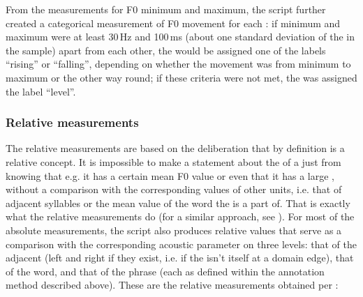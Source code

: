 \documentclass[output=paper]{LSP/langsci}
\begin{document}
From the measurements for F0 minimum and maximum, the script further created a categorical measurement of F0 movement for each : if minimum and maximum were at least 30\,Hz and 100\,ms (about one standard deviation of the  in the sample) apart from each other, the  would be assigned one of the labels “rising” or “falling”, depending on whether the movement was from minimum to maximum or the other way round; if these criteria were not met, the  was assigned the label “level”.  

\subsubsection{Relative measurements}
\label{sec:buc:3.4.2}


The relative measurements are based on the deliberation that  by definition is a relative concept. It is impossible to make a statement about the  of a  just from knowing that e.g. it has a certain mean F0 value or even that it has a large , without a comparison with the corresponding values of other units, i.e. that of adjacent syllables or the mean value of the word the  is a part of. That is exactly what the relative measurements do (for a similar approach, see \citealt{PamiesBertran1996}). For most of the absolute measurements, the script also produces relative values that serve as a comparison with the corresponding acoustic parameter on three levels: that of the adjacent  (left and right if they exist, i.e. if the  isn’t itself at a domain edge), that of the word, and that of the phrase (each as defined within the annotation method described above). These are the relative measurements obtained per :
\end{document}
